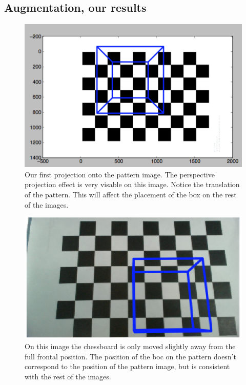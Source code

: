 \subsection{Augmentation, our results}

\begin{figure}[H]
\center
\includegraphics{pics/result0.png}
\caption{Our first projection onto the pattern image. The perspective projection effect is very visable on this image. Notice the translation of the pattern. This will affect the placement of the box on the rest of the images.}
\label{result0}
\end{figure}

\begin{figure}[H]
\center
\includegraphics{pics/result1.png}
\caption{On this image the chessboard is only moved slightly away from the full frontal position. The position of the boc on the pattern doesn’t correspond to the position of the pattern image, but is consistent with the rest of the images.}
\label{result1}
\end{figure}

